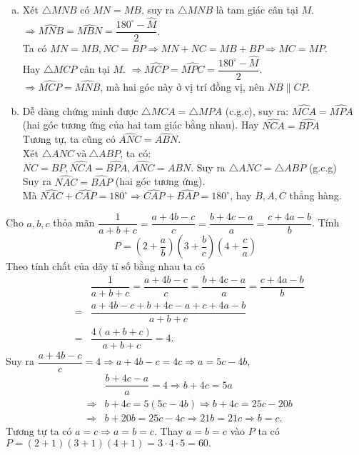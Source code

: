 \begin{ex}
{\begin{enumerate}[b)]
	Mà $\widehat{NKM}+ \widehat{BKM}= 180^{\circ} \Rightarrow \widehat{NKM}= \widehat{BKM}= \dfrac{180^{\circ}- \widehat{M}}{2}$. Hay $NB \perp MA.$
	\item Xét $\triangle MNB$ có $MN= MB$, suy ra $\triangle MNB$ là tam giác cân tại $M$.\\
	$\Rightarrow \widehat{MNB}= \widehat{MBN}= \dfrac{180^{\circ}- \widehat{M}}{2}$.\\
	Ta có $MN= MB, NC= BP \Rightarrow MN+ NC= MB+ BP \Rightarrow MC= MP$.\\ 
	Hay $\triangle MCP$ cân tại $M$. $\Rightarrow \widehat{MCP}= \widehat{MPC}= \dfrac{180^{\circ}- \widehat{M}}{2}.$\\
	$\Rightarrow \widehat{MCP}= \widehat{MNB}$, mà hai góc này ở vị trí đồng vị, nên $NB \parallel CP.$
	\item Dễ dàng chứng minh được $\triangle MCA= \triangle MPA$ (c.g.c), suy ra: $\widehat{MCA}= \widehat{MPA}$ (hai góc tương ứng của hai tam giác bằng nhau). Hay $\widehat{NCA}= \widehat{BPA}$\\
	Tương tự, ta cũng có $\widehat{ANC}= \widehat{ABN}$.\\
	Xét $\triangle ANC\ \text{và}\ \triangle ABP$, ta có:\\
	$NC= BP, \widehat{NCA}= \widehat{BPA},  \widehat{ANC}= \widehat{ABN}$. Suy ra $\triangle ANC= \triangle ABP$ (g.c.g)\\
	Suy ra $\widehat{NAC}= \widehat{BAP}$ (hai góc tương ứng).\\
	Mà $\widehat{NAC}+ \widehat{CAP}= 180^{\circ} \Rightarrow \widehat{CAP}+ \widehat{BAP}= 180^{\circ}$, hay $B,A,C$ thẳng hàng.
\end{enumerate}		
	
	}
\end{ex}
		\begin{ex}%
	Cho $a, b, c$ thỏa mãn $\dfrac{1}{a+ b+ c}= \dfrac{a+ 4b-c}{c}= \dfrac{b+ 4c- a}{a}= \dfrac{c+ 4a-b}{b}$. Tính
	$$P= \left(2+ \dfrac{a}{b}\right)\left(3+ \dfrac{b}{c}\right)\left(4+ \dfrac{c}{a}\right)$$
	\loigiai
	{
Theo tính chất của dãy tỉ số bằng nhau ta có	
\begin{eqnarray*}
	&&\dfrac{1}{a+ b+ c}= \dfrac{a+ 4b-c}{c}= \dfrac{b+ 4c- a}{a}= \dfrac{c+ 4a- b}{b}\\
	&= & \dfrac{a+ 4b- c+ b+ 4c- a+ c+ 4a- b}{a+ b+ c}\\
	&=  & \dfrac{4(a+ b+ c)}{a+ b+ c}= 4.
\end{eqnarray*}
Suy ra $\dfrac{a+ 4b- c}{c}= 4 \Rightarrow a+ 4b- c= 4c \Rightarrow a= 5c- 4b$,
\begin{eqnarray*}
	&&\dfrac{b+ 4c- a}{a}= 4 \Rightarrow b+ 4c= 5a\\
	&\Rightarrow & b+ 4c= 5(5c- 4b) \Rightarrow b+ 4c= 25c- 20b\\
	&\Rightarrow  & b+ 20b= 25c- 4c \Rightarrow 21b= 21c \Rightarrow b= c.
\end{eqnarray*}
Tương tự ta có $a= c \Rightarrow a= b= c.$
Thay $a= b= c$ vào $P$ ta có\\
 $P= (2+ 1)(3+ 1)(4+ 1)= 3 \cdot 4 \cdot 5= 60.$
}

\end{ex}	
	
